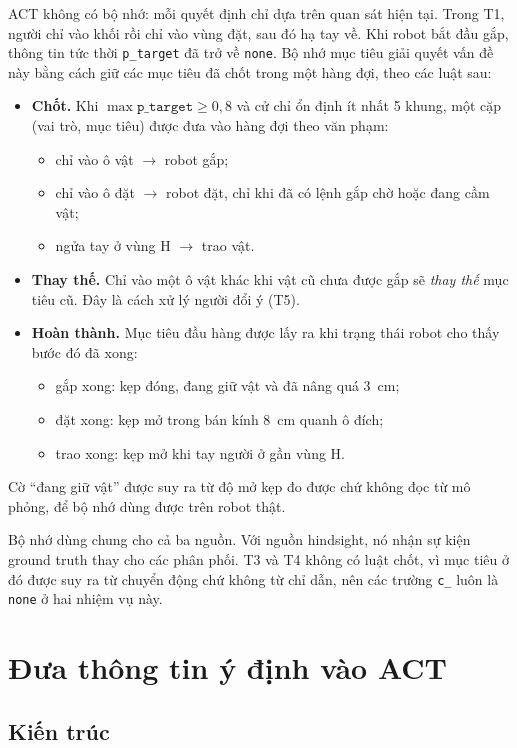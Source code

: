 ACT không có bộ nhớ: mỗi quyết định chỉ dựa trên quan sát hiện tại. Trong T1, người chỉ vào khối rồi chỉ vào vùng đặt, sau đó hạ tay về. Khi robot bắt đầu gắp, thông tin tức thời \texttt{p\_target} đã trở về \texttt{none}. Bộ nhớ mục tiêu giải quyết vấn đề này bằng cách giữ các mục tiêu đã chốt trong một hàng đợi, theo các luật sau:
\begin{itemize}
  \item \textbf{Chốt.} Khi $\max \texttt{p\_target} \geq 0{,}8$ và cử chỉ ổn định ít nhất 5 khung, một cặp (vai trò, mục tiêu) được đưa vào hàng đợi theo văn phạm:
    \begin{itemize}
      \item chỉ vào ô vật $\to$ robot gắp;
      \item chỉ vào ô đặt $\to$ robot đặt, chỉ khi đã có lệnh gắp chờ hoặc đang cầm vật;
      \item ngửa tay ở vùng H $\to$ trao vật.
    \end{itemize}
  \item \textbf{Thay thế.} Chỉ vào một ô vật khác khi vật cũ chưa được gắp sẽ \emph{thay thế} mục tiêu cũ. Đây là cách xử lý người đổi ý (T5).
  \item \textbf{Hoàn thành.} Mục tiêu đầu hàng được lấy ra khi trạng thái robot cho thấy bước đó đã xong:
    \begin{itemize}
      \item gắp xong: kẹp đóng, đang giữ vật và đã nâng quá 3~cm;
      \item đặt xong: kẹp mở trong bán kính 8~cm quanh ô đích;
      \item trao xong: kẹp mở khi tay người ở gần vùng H.
    \end{itemize}
\end{itemize}

Cờ ``đang giữ vật'' được suy ra từ độ mở kẹp đo được chứ không đọc từ mô phỏng, để bộ nhớ dùng được trên robot thật.

Bộ nhớ dùng chung cho cả ba nguồn. Với nguồn hindsight, nó nhận sự kiện ground truth thay cho các phân phối. T3 và T4 không có luật chốt, vì mục tiêu ở đó được suy ra từ chuyển động chứ không từ chỉ dẫn, nên các trường \texttt{c\_} luôn là \texttt{none} ở hai nhiệm vụ này.

\section{Đưa thông tin ý định vào ACT}
\label{sec:intent-act}

\subsection{Kiến trúc}


